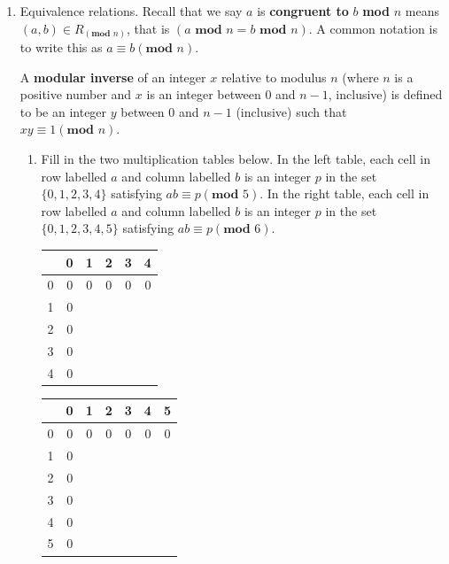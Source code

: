 \documentclass[12pt, oneside]{article}
\begin{document}
\begin{enumerate}[labelindent=0pt, leftmargin=0pt]
    \item Equivalence relations.  Recall that we say $a$ is {\bf congruent to} $b$ \textbf{mod} $n$ 
    means $(a, b) \in R_{(\textbf{mod } n)}$, that is $(a \textbf{ mod } n = b \textbf{ mod } n)$.
    A common notation is to write this as $a \equiv b (\textbf{mod } n)$.
    
    A {\bf modular inverse} of an integer $x$ relative to modulus $n$ (where $n$ 
    is a positive number and $x$ is an integer between $0$ and $n-1$, inclusive) 
    is defined to be an integer $y$ between $0$ and $n-1$ (inclusive) such that 
    $xy \equiv 1 (\textbf{mod } n)$.
    \begin{enumerate}
        \item Fill in the two multiplication tables below. In the left table,  each  cell in 
        row labelled $a$ and column labelled $b$ is an integer $p$ in the set $\{0, 1, 2, 3, 4\}$
        satisfying $ab \equiv p ({\textbf{mod } 5})$.
        In the right table, 
        each  cell in 
        row labelled $a$ and column labelled $b$ is an integer $p$ in the set $\{0, 1, 2, 3, 4, 5\}$
        satisfying $ab \equiv p ({\textbf{mod } 6})$.

        \begin{center}
            \begin{tabular}{|c||c|c|c|c|c|}
                \hline
                  & 0 & 1 & 2 & 3 & 4 \\
                  \hline \hline
                0 & 0 & 0 & 0 & 0 & 0 \\
                \hline
                1 & 0 & ~ & ~ & ~ & ~ \\
                \hline
                2 & 0 & ~ & ~ & ~ & ~ \\
                \hline
                3 & 0 & ~ & ~ & ~ & ~ \\
                \hline
                4 & 0 & ~ & ~ & ~ & ~ \\
                \hline
            \end{tabular}
            \hspace{2in}
            \begin{tabular}{|c||c|c|c|c|c|c|}
                \hline
                  & 0 & 1 & 2 & 3 & 4 &5 \\
                  \hline \hline
                0 & 0 & 0 & 0 & 0 & 0 & 0\\
                \hline
                1 & 0 & ~ & ~ & ~ & ~ &\\
                \hline
                2 & 0 & ~ & ~ & ~ & ~ &\\
                \hline
                3 & 0 & ~ & ~ & ~ & ~ &\\
                \hline
                4 & 0 & ~ & ~ & ~ & ~ &\\
                \hline
                5 & 0 & ~ & ~ & ~ & ~ &\\
                \hline
            \end{tabular}
        \end{center}


\end{enumerate}
\end{enumerate}
\end{document}
